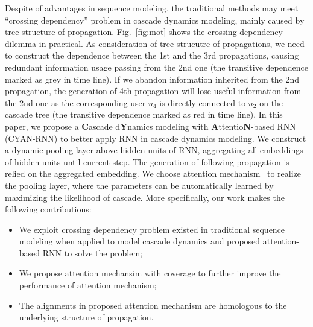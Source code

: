 Despite of advantages in sequence modeling, the traditional methods
may meet ``crossing dependency'' problem in cascade dynamics modeling, mainly
caused by
tree structure of propagation. Fig.~\ref{fig:mot} shows the crossing
dependency dilemma in practical. 
As consideration
of tree strucutre of propagations, we need to construct the dependence between
the 1st and the 3rd propagations, causing redundant information usage passing
from the 2nd one (the transitive dependence marked as grey in time
line). If we abandon information inherited from the 2nd propagation, the
generation of 4th propagation will lose useful information from the 2nd
one as the corresponding user $u_4$ is directly connected to $u_2$ on the
cascade tree
(the transitive dependence marked as red in time line). 
In this paper, we propose a \textbf{C}ascade d\textbf{Y}namics
modeling with \textbf{A}ttentio\textbf{N}-based RNN (CYAN-RNN) to better
apply RNN in cascade dynamics modeling. We construct a dynamic pooling
layer above hidden units of RNN, aggregating all embeddings of hidden units
until current step. The generation of following propagation is relied on the
aggregated embedding. 
We choose attention mechanism~\cite{bahdanau2014neural} to realize the pooling layer,
where the parameters can be automatically learned by maximizing the
likelihood of cascade. 
More specifically, our work makes the following contributions:
\begin{itemize}
  \item We exploit crossing dependency problem existed in traditional sequence
  modeling when applied to model cascade dynamics and proposed attention-based
  RNN to solve the problem;
  \item We propose attention mechansim with coverage to further improve the
  performance of attention mechanism;
  \item The alignments in proposed attention mechanism are homologous to the
  underlying structure of propagation.
\end{itemize}
